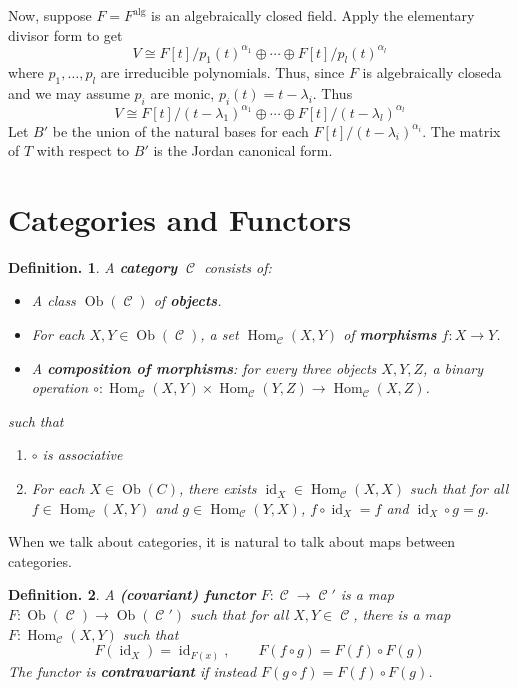 \documentclass[11pt, a4paper]{memoir}
\theoremstyle{change}
\theoremstyle{plain}
\theoremstyle{nonumberplain}
\newtheorem{definition}{Definition.}
\DeclareMathOperator{\Hom}{Hom}
\DeclareMathOperator{\id}{id}
\DeclareMathOperator{\Ct}{\mathcal{C}}
\DeclareMathOperator{\Ob}{Ob}
\numberwithin{equation}{section}
\begin{document}
Now, suppose $F=F^{\text{alg}}$ is an algebraically closed field.
Apply the elementary divisor form to get
\begin{equation*}
    V\cong F[t]/p_1(t)^{\alpha_1}\oplus\cdots\oplus F[t]/p_l(t)^{\alpha_l}
\end{equation*}
where $p_1,\ldots,p_l$ are irreducible polynomials.
Thus, since $F$ is algebraically closeda and we may assume $p_i$ are monic, $p_i(t)=t-\lambda_i$.
Thus
\begin{equation*}
    V\cong F[t]/(t-\lambda_1)^{\alpha_1}\oplus\cdots\oplus F[t]/(t-\lambda_l)^{\alpha_l}
\end{equation*}
Let $B'$ be the union of the natural bases for each $F[t]/(t-\lambda_i)^{\alpha_i}$.
The matrix of $T$ with respect to $B'$ is the Jordan canonical form.
\section{Categories and Functors}
\begin{definition}
    A \textbf{category} $\Ct$ consists of:
    \begin{itemize}[nolistsep]
        \item A class $\Ob(\Ct)$ of \textbf{objects}.
        \item For each $X,Y\in\Ob(\Ct)$, a set $\Hom_{\Ct}(X,Y)$ of \textbf{morphisms} $f:X\to Y$.
        \item A \textbf{composition of morphisms}: for every three objects $X,Y,Z$, a binary operation $\circ:\Hom_{\Ct}(X,Y)\times\Hom_{\Ct}(Y,Z)\to\Hom_{\Ct}(X,Z)$.
    \end{itemize}
    such that
    \begin{enumerate}[nolistsep]
        \item $\circ$ is associative
        \item For each $X\in\Ob(C)$, there exists $\id_X\in\Hom_{\Ct}(X,X)$ such that for all $f\in\Hom_{\Ct}(X,Y)$ and $g\in\Hom_{\Ct}(Y,X)$, $f\circ\id_X=f$ and $\id_X\circ g=g$.
    \end{enumerate}
\end{definition}
When we talk about categories, it is natural to talk about maps between categories.
\begin{definition}
    A \textbf{(covariant) functor} $F:\Ct\to \Ct'$ is a map $F:\Ob(\Ct)\to\Ob(\Ct')$ such that for all $X,Y\in \Ct$, there is a map $F:\Hom_{\Ct}(X,Y)$ such that
    \begin{equation*}
        F(\id_X)=\id_{F(x)},\qquad F(f\circ g)=F(f)\circ F(g)
    \end{equation*}
    The functor is \textbf{contravariant} if instead $F(g\circ f)=F(f)\circ F(g)$.
\end{definition}
\end{document}
